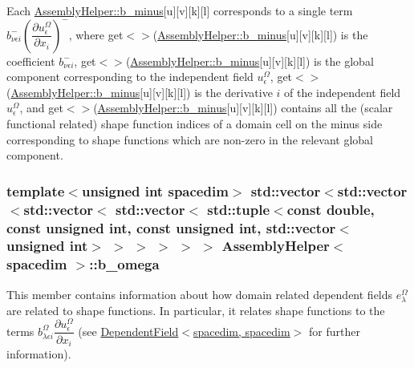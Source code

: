 Each \hyperlink{class_assembly_helper_a6f51f8b4dfdae385a2e2fe2dd9e66cdb}{Assembly\+Helper\+::b\+\_\+minus}\mbox{[}{\ttfamily u}\mbox{]}\mbox{[}{\ttfamily v}\mbox{]}\mbox{[}{\ttfamily k}\mbox{]}\mbox{[}{\ttfamily l}\mbox{]} corresponds to a single term $b^-_{\nu\epsilon i} \left(\dfrac{\partial u^\Omega_\epsilon}{\partial x_i}\right)^-$, where {\ttfamily get$<${$>$}(\hyperlink{class_assembly_helper_a6f51f8b4dfdae385a2e2fe2dd9e66cdb}{Assembly\+Helper\+::b\+\_\+minus}}\mbox{[}{\ttfamily u}\mbox{]}\mbox{[}{\ttfamily v}\mbox{]}\mbox{[}{\ttfamily k}\mbox{]}\mbox{[}{\ttfamily l}\mbox{]}) is the coefficient $b^-_{\nu\epsilon i}$, {\ttfamily get$<${$>$}(\hyperlink{class_assembly_helper_a6f51f8b4dfdae385a2e2fe2dd9e66cdb}{Assembly\+Helper\+::b\+\_\+minus}}\mbox{[}{\ttfamily u}\mbox{]}\mbox{[}{\ttfamily v}\mbox{]}\mbox{[}{\ttfamily k}\mbox{]}\mbox{[}{\ttfamily l}\mbox{]}) is the global component corresponding to the independent field $u^\Omega_\epsilon$, {\ttfamily get$<${$>$}(\hyperlink{class_assembly_helper_a6f51f8b4dfdae385a2e2fe2dd9e66cdb}{Assembly\+Helper\+::b\+\_\+minus}}\mbox{[}{\ttfamily u}\mbox{]}\mbox{[}{\ttfamily v}\mbox{]}\mbox{[}{\ttfamily k}\mbox{]}\mbox{[}{\ttfamily l}\mbox{]}) is the derivative $i$ of the independent field $u^\Omega_\epsilon$, and {\ttfamily get$<${$>$}(\hyperlink{class_assembly_helper_a6f51f8b4dfdae385a2e2fe2dd9e66cdb}{Assembly\+Helper\+::b\+\_\+minus}}\mbox{[}{\ttfamily u}\mbox{]}\mbox{[}{\ttfamily v}\mbox{]}\mbox{[}{\ttfamily k}\mbox{]}\mbox{[}{\ttfamily l}\mbox{]}) contains all the (scalar functional related) shape function indices of a domain cell on the minus side corresponding to shape functions which are non-\/zero in the relevant global component. 
\subsubsection[{\texorpdfstring{b\+\_\+omega}{b_omega}}]{\setlength{\rightskip}{0pt plus 5cm}template$<$unsigned int spacedim$>$ std\+::vector$<$std\+::vector$<$std\+::vector$<$ std\+::vector$<$ std\+::tuple$<$const double, const unsigned int, const unsigned int, std\+::vector$<$unsigned int$>$ $>$ $>$ $>$ $>$ $>$ {\bf Assembly\+Helper}$<$ spacedim $>$\+::b\+\_\+omega\hspace{0.3cm}{\ttfamily [private]}}\hypertarget{class_assembly_helper_a5fbb532e798c2427af5285c2df10c9f4}{}\label{class_assembly_helper_a5fbb532e798c2427af5285c2df10c9f4}
This member contains information about how domain related dependent fields $e^\Omega_\lambda$ are related to shape functions. In particular, it relates shape functions to the terms $b^\Omega_{\lambda \epsilon i} \dfrac{\partial u^\Omega_\epsilon}{\partial x_i}$ (see \hyperlink{class_dependent_field_3_01spacedim_00_01spacedim_01_4}{Dependent\+Field$<$spacedim, spacedim$>$} for further information).

